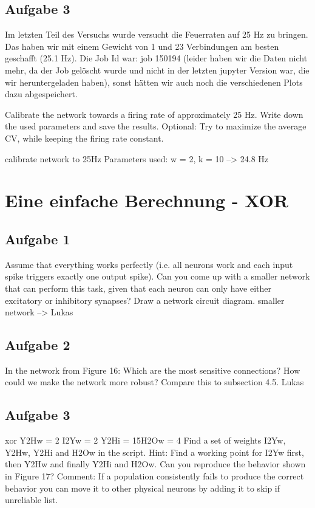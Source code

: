 \documentclass[10pt,a4paper]{scrartcl}
\begin{document}
\subsection{Aufgabe 3}
Im letzten Teil des Versuchs wurde versucht die Feuerraten auf 25 Hz zu bringen. Das haben wir mit einem Gewicht von 1 und 23 Verbindungen am besten geschafft (25.1 Hz). Die Job Id war: job 150194 (leider haben wir die Daten nicht mehr, da der Job gelöscht wurde und nicht in der letzten jupyter Version war, die wir heruntergeladen haben), sonst hätten wir auch noch die verschiedenen Plots dazu abgespeichert. 
 
Calibrate the network towards a firing rate of approximately 25 Hz. Write down the
used parameters and save the results. Optional: Try to maximize the average CV, while
keeping the firing rate constant.

calibrate network to 25Hz
Parameters used:
w = 2, k = 10
--> 24.8 Hz


\newpage


\section{Eine einfache Berechnung - XOR}


\subsection{Aufgabe 1}
Assume that everything works perfectly (i.e. all neurons work and each input spike
triggers exactly one output spike). Can you come up with a smaller network that can
perform this task, given that each neuron can only have either excitatory or inhibitory
synapses? Draw a network circuit diagram.
smaller network --> Lukas

\subsection{Aufgabe 2}
In the network from Figure 16: Which are the most sensitive connections? How could
we make the network more robust? Compare this to subsection 4.5.
Lukas

\subsection{Aufgabe 3}
xor Y2Hw = 2 I2Yw = 2 Y2Hi = 15H2Ow = 4 
Find a set of weights I2Yw, Y2Hw, Y2Hi and H2Ow in the script.
Hint: Find a working point for I2Yw first, then Y2Hw and finally Y2Hi and H2Ow.
Can you reproduce the behavior shown in Figure 17?
Comment: If a population consistently fails to produce the correct behavior you can
move it to other physical neurons by adding it to skip if unreliable list.
\end{document}

